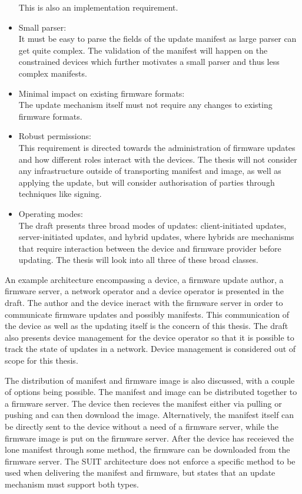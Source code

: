 \documentclass[0-thesis.tex]{subfiles}
\begin{document}
\begin{itemize}
            This is also an implementation requirement.
    \item Small parser:\\
            It must be easy to parse the fields of the update manifest as large parser can 
            get quite complex. The validation of the manifest will happen on the constrained 
            devices which further motivates a small parser and thus less complex manifests.
    \item Minimal impact on existing firmware formats:\\
            The update mechanism itself must not require any changes to existing firmware 
            formats.
    \item Robust permissions:\\
            This requirement is directed towards the administration of firmware updates and 
            how different roles interact with the devices. The thesis will not consider any 
            infrastructure outside of transporting manifest and image, as well as applying 
            the update, but will consider authorisation of parties through techniques like 
            signing.
    \item Operating modes:\\
            The draft presents three broad modes of updates: client-initiated updates, 
            server-initiated updates, and hybrid updates, where hybrids are mechanisms 
            that require interaction between the device and firmware provider before 
            updating. The thesis will look into all three of these broad classes.
\end{itemize}

An example architecture encompassing a device, a firmware update author, a firmware server,
a network operator and a device operator is presented in the draft. The author and the device 
ineract with the firmware server in order to communicate firmware updates and possibly 
manifests. This communication of the device as well as the updating itself is the concern 
of this thesis. The draft also presents device management for the device operator so that 
it is possible to track the state of updates in a network. Device management is considered 
out of scope for this thesis.

The distribution of manifest and firmware image is also discussed, with a couple of options 
being possible. The manifest and image can be distributed together to a firmware server. 
The device then recieves the manifest either via pulling or pushing and can then download
the image. Alternatively, the manifest itself can be directly sent to the device without a 
need of a firmware server, while the firmware image is put on the firmware server. After the 
device has receieved the lone manifest through some method, the firmware can be downloaded 
from the firmware server. The SUIT architecture does not enforce a specific method to be used 
when delivering the manifest and firmware, but states that an update mechanism must support 
both types.
\end{document}
